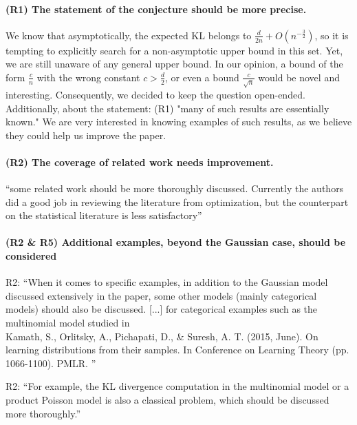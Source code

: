 \paragraph{(R1) The statement of the conjecture should be more precise.}
We know that asymptotically, the expected KL belongs to $\frac{d}{2 n} + O (n^{-\frac{3}{2}})$, so it is tempting to explicitly search for a non-asymptotic upper bound in this set. 
Yet, we are still unaware of any general upper bound.
In our opinion, a bound of the form $\frac{c}{n}$ with the wrong constant $c>\frac{d}{2}$, or even a bound $\frac{c}{\sqrt{n}}$ would be novel and interesting.
Consequently, we decided to keep the question open-ended.  
Additionally, about the statement: (R1) "many of such results are essentially known."
We are very interested in knowing examples of such   results, as we believe they could help us improve the paper.

\paragraph{(R2) The coverage of related work needs improvement.}
``some related work should be more thoroughly discussed. Currently the authors did a good job in reviewing the literature from optimization, but the counterpart on the statistical literature is less satisfactory''

\paragraph{(R2 \& R5) Additional examples, beyond the Gaussian case, should be considered}
R2:
``When it comes to specific examples, in addition to the Gaussian model discussed extensively in the paper, some other models (mainly categorical models) should also be discussed.
[...] for categorical examples such as the multinomial model studied in
~\\
Kamath, S., Orlitsky, A., Pichapati, D., \& Suresh, A. T. (2015, June). On learning distributions from their samples. In Conference on Learning Theory (pp. 1066-1100). PMLR.
''

R2:
``For example, the KL divergence computation in the multinomial model or a product Poisson model is also a classical problem, which should be discussed more thoroughly.''


